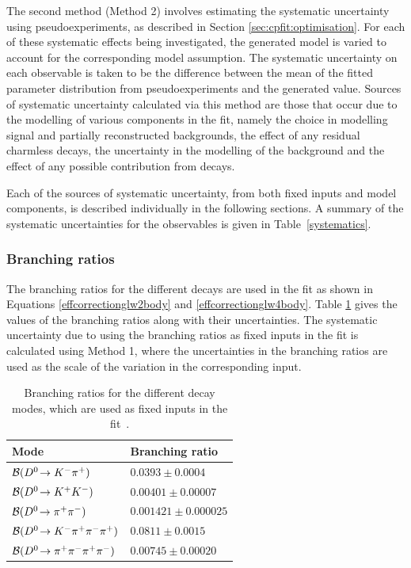 The second method (Method 2) involves estimating the systematic uncertainty using pseudoexperiments, as described in Section \ref{sec:cpfit:optimisation}. For each of these systematic effects being investigated, the generated model is varied to account for the corresponding model assumption. The systematic uncertainty on each observable is taken to be the difference between the mean of the fitted parameter distribution from pseudoexperiments and the generated value. Sources of systematic uncertainty calculated via this method are those that occur due to the modelling of various components in the \CP fit, namely the choice in modelling signal and partially reconstructed backgrounds, the effect of any residual charmless \B decays, the uncertainty in the modelling of the  background and the effect of any possible contribution from  decays.

Each of the sources of systematic uncertainty, from both fixed inputs and model components, is described individually in the following sections. A summary of the systematic uncertainties for the \CP observables is given in Table~\ref{systematics}.

\subsubsection{Branching ratios}

The branching ratios for the different \Dz decays are used in the \CP fit as shown in Equations \ref{effcorrectionglw2body} and \ref{effcorrectionglw4body}. Table \ref{BR} gives the values of the branching ratios along with their uncertainties. The systematic uncertainty due to using the branching ratios as fixed inputs in the \CP fit is calculated using Method 1, where the uncertainties in the branching ratios are used as the scale of the variation in the corresponding input.

\begin{table}
\centering
\begin{tabular}{l|l}
\hline
Mode & Branching ratio \\
\hline
$\mathcal{B}({{D}^0}\!\rightarrow {\ensuremath{{K}^-}}{\ensuremath{{\pi}^+}})$ & $0.0393 \pm 0.0004$ \\
$\mathcal{B}({{D}^0}\!\rightarrow {\ensuremath{{K}^+}}{\ensuremath{{K}^-}})$ & $0.00401 \pm 0.00007$ \\
$\mathcal{B}({{D}^0}\!\rightarrow {\ensuremath{{\pi}^+}}{\ensuremath{{\pi}^-}})$ & $0.001421 \pm 0.000025$ \\
$\mathcal{B}({{D}^0}\!\rightarrow {\ensuremath{{K}^-}}{\ensuremath{{\pi}^+}}{\ensuremath{{\pi}^-}}{\ensuremath{{\pi}^+}})$ & $0.0811 \pm 0.0015$ \\
$\mathcal{B}({{D}^0}\!\rightarrow {\ensuremath{{\pi}^+}}{\ensuremath{{\pi}^-}}{\ensuremath{{\pi}^+}}{\ensuremath{{\pi}^-}})$ & $0.00745 \pm 0.00020$ \\
\hline
\end{tabular}
\caption{Branching ratios for the different \Dz decay modes, which are used as fixed inputs in the \CP fit~\cite{PDG2014}.}
\label{BR}
\end{table}

